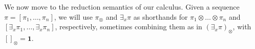 \documentclass{llncs}
\def\1{{\mathbf 1}}
\newcommand{\tell}{{\bf tell}}
\newcommand{\ask}{{\bf ask}}
\newcommand{\ostop}{{\bf stop}}
\def\1{{\mathbf 1}}
\begin{document}

We now move to the reduction semantics of our calculus. 
%
Given a sequence $\pi = [\pi_1, \ldots, \pi_n]$, we will use 
$\pi_\otimes$ and $\exists_x \pi$
as shorthands for $\pi_1 \otimes \ldots \otimes \pi_n$ and
$[\exists_x \pi_1, \ldots, \exists_x \pi_n]$, respectively,
sometimes combining them as in $(\exists_x \pi)_\otimes$,
with $[]_\otimes = \1$.
\end{document}
